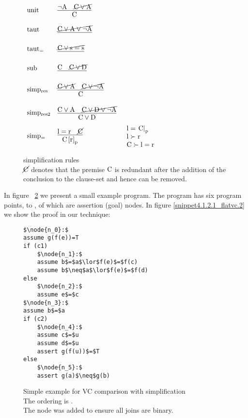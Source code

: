 \begin{figure}
$
\begin{array}[c]{llll}
\m{unit} & \vcenter{\infer[]{\m{C}                            }{\m{\lnot A}  & \cancel{\m{C \lor A}}}} & \parbox[c][1.0cm]{3cm}{}\\
\m{taut} & \vcenter{\infer[]{\m{}                             }{\cancel{\m{C \lor A \lor \lnot A}}}} & \parbox[c][1.0cm]{3cm}{}\\
\m{taut_{=}} & \vcenter{\infer[]{\m{}                             }{\cancel{\m{C \lor s=s}}}} & \parbox[c][1.0cm]{3cm}{}\\
\m{sub} & \vcenter{\infer[]  {\m{}                             }{\m{C} & \cancel{\m{C \lor D}}}} & \parbox[c][1.0cm]{3cm}{}\\
\m{simp_{res}} & \vcenter{\infer[]{\m{C}                      }{\cancel{\m{C \lor A }} & \cancel{\m{C \lor \lnot A}}}} & \parbox[c][1.2cm]{3cm}{}\\
\m{simp_{res2}} & \vcenter{\infer[]{\m{C \lor D}              }{\m{C \lor A } & \cancel{\m{C \lor D \lor \lnot A}}}} & \parbox[c][1.2cm]{3cm}{}\\
\m{simp_{=}} & \vcenter{\infer[]{\m{\termRepAt{C}{r}{p}}}{\m{l=r} & \cancel{\m{C}}}}   &
\parbox[c][1.2cm]{3cm}{\m{l=\termAt{C}{p}}\\\m{l \succ r}\\\m{C \succ l=r}}\\
\end{array}
$
\caption{simplification rules\\
$\cancel{\mathrm{C}}$ denotes that the premise $\mathrm{C}$ is redundant after the addition of the conclusion to the clause-set and hence can be removed.
}
\label{simp_rules.1}
\end{figure}



In figure ~\ref{snippet4.1.2.1} we present a small example program. 
The program has six program points,  to , of which  are assertion (goal) nodes.
In figure \ref{snippet4.1.2.1_flatvc.2} we show the proof in our technique:


\begin{figure}
\begin{lstlisting}
$\node{n_0}:$
assume g(f(e))=T
if (c1)
	$\node{n_1}:$	
	assume b$=$a$\lor$f(e)$=$f(c)
	assume b$\neq$a$\lor$f(e)$=$f(d)
else	
	$\node{n_2}:$
	assume e$=$c
$\node{n_3}:$
assume b$=$a
if (c2)
	$\node{n_4}:$
	assume c$=$u
	assume d$=$u
	assert g(f(u))$=$T
else	
	$\node{n_5}:$
	assert g(a)$\neq$g(b)
\end{lstlisting}
\caption{Simple example for VC comparison with simplification\\
The ordering is .\\
The node  was added to ensure all joins are binary.
}
\label{snippet4.1.2.1}
\end{figure}

